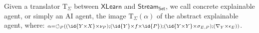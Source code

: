 \begin{definition}
Given a translator $\mathrm{T}_{\Sigma}$ between $\mathsf{XLearn}$ and $\mathsf{Stream_{Set}}$, we call concrete explainable agent, or simply an AI agent, the image $\mathrm{T}_{\Sigma}(\alpha)$ of the abstract explainable agent, where:
${\scriptstyle \alpha=\fbk[P]\left((\id{Y\times X}\times\nu_{P});(\id{Y}\times f \times \id{P}); (\id{Y\times Y}\times\swap{E,P}) ;(\nabla_{Y}\times \discard_E)\right)}$. 
\end{definition}







